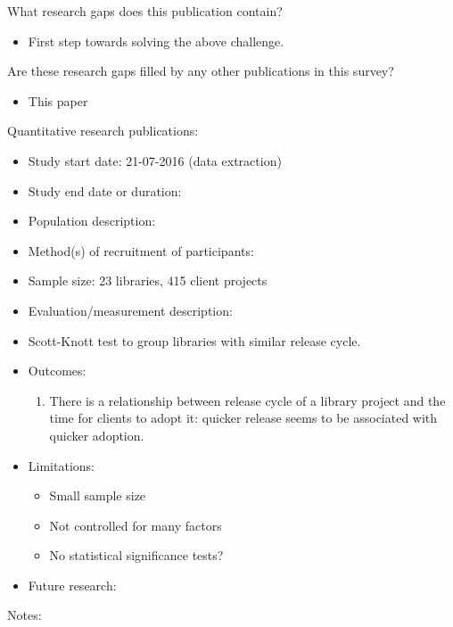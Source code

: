 \documentclass[]{book}
\providecommand{\tightlist}{%
  \setlength{\itemsep}{0pt}\setlength{\parskip}{0pt}}
\begin{document}
What research gaps does this publication contain?

\begin{itemize}
\tightlist
\item
  First step towards solving the above challenge.
\end{itemize}

Are these research gaps filled by any other publications in this survey?

\begin{itemize}
\tightlist
\item
  This paper
\end{itemize}

Quantitative research publications:

\begin{itemize}
\tightlist
\item
  Study start date: 21-07-2016 (data extraction)
\item
  Study end date or duration:
\item
  Population description:
\item
  Method(s) of recruitment of participants:
\item
  Sample size: 23 libraries, 415 client projects
\item
  Evaluation/measurement description:
\item
  Scott-Knott test to group libraries with similar release cycle.
\item
  Outcomes:

  \begin{enumerate}
  \def\labelenumi{\arabic{enumi}.}
  \tightlist
  \item
    There is a relationship between release cycle of a library project
    and the time for clients to adopt it: quicker release seems to be
    associated with quicker adoption.
  \end{enumerate}
\item
  Limitations:

  \begin{itemize}
  \tightlist
  \item
    Small sample size
  \item
    Not controlled for many factors
  \item
    No statistical significance tests?
  \end{itemize}
\item
  Future research:
\end{itemize}

Notes:
\end{document}
